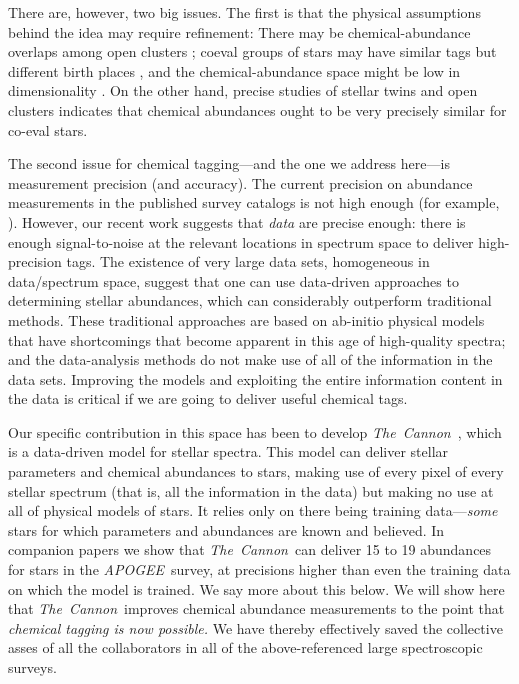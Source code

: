 \documentclass[12pt, letterpaper, preprint]{aastex}
\newcommand{\acronym}[1]{{\small{#1}}}
\newcommand{\project}[1]{\textsl{#1}}
\newcommand{\apogee}{\project{\acronym{APOGEE}}}
\newcommand{\thecannon}{\project{The~Cannon}}
\begin{document}
There are, however, two big issues.
The first is that the physical assumptions behind the idea may require
refinement:
There may be chemical-abundance overlaps among open clusters
\citep{blancocuaresma}; coeval groups of stars may have similar tags
but different birth places \citep{mitschang}, and the
chemical-abundance space might be low in dimensionality \citep{what}.
On the other hand, precise studies of stellar twins \citep{melendez, jofre}
and open clusters \citep{bovy} indicates that chemical abundances ought to be
very precisely similar for co-eval stars.

The second issue for chemical tagging---and the one we address
here---is measurement precision (and accuracy).
The current precision on abundance measurements in the published survey catalogs is not high enough (for example, \citealt{martel, ting}).
However, our recent work \citep{thecannon} suggests that \emph{data} are precise enough: there is enough signal-to-noise at the relevant 
locations in spectrum space to deliver high-precision tags.
The existence of very large data sets, homogeneous in data/spectrum space, suggest that one can use data-driven approaches to determining stellar abundances, which can considerably outperform traditional methods.
These traditional approaches are based on ab-initio physical models
that have shortcomings that become apparent in this age of high-quality spectra; and the data-analysis methods do not make use of all of the information in the data sets.
Improving the models and exploiting the entire information
content in the data is critical if we are going to deliver useful
chemical tags.

Our specific contribution in this space has been to develop
\thecannon\ \citep{thecannon, ages}, which is a data-driven model for
stellar spectra.
This model can deliver stellar parameters and chemical abundances to
stars, making use of every pixel of every stellar spectrum (that is,
all the information in the data) but making no use at all of physical
models of stars.
It relies only on there being training data---\emph{some} stars for
which parameters and abundances are known and believed.
In companion papers \citep{casey16, ness16} we show that
\thecannon\ can deliver 15 to 19 abundances for stars in the
\apogee\ survey, at precisions higher than even the training data on
which the model is trained.
We say more about this below.
We will show here that \thecannon\ improves chemical abundance measurements
to the point that \emph{chemical tagging is now possible.}
We have thereby effectively saved the collective asses of all the
collaborators in all of the above-referenced large spectroscopic
surveys.
\end{document}
